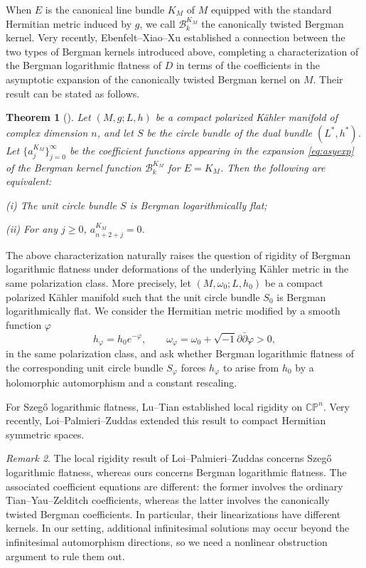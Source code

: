 \documentclass[11pt,reqno]{amsart}
\newtheorem{theorem}{Theorem}[section]
\theoremstyle{corollary}
\theoremstyle{conjecture}
\theoremstyle{assumption}
\theoremstyle{proposition}
\theoremstyle{remark}
\newtheorem{remark}[theorem]{Remark}
\numberwithin{equation}{section}
\newcommand{\ii}{\ensuremath{\sqrt{-1}}}
\newcommand{\pa}{\partial}
\newcommand{\pp}{\bar\partial}
\begin{document}
When $E$ is the canonical line bundle $K_M$ of $M$ equipped with the standard Hermitian metric induced by $g$, we call $\mathcal{B}_k^{K_M}$ the canonically twisted Bergman kernel. Very recently, Ebenfelt--Xiao--Xu \cite{EbenfeltXiaoXu2026} established a connection between the two types of Bergman kernels introduced above, completing a characterization of the Bergman logarithmic flatness of $D$ in terms of the coefficients in the asymptotic expansion of the canonically twisted Bergman kernel on $M$. Their result can be stated as follows.

\begin{theorem}[{\cite[Theorem~1.11]{EbenfeltXiaoXu2026}}]\label{thm:logflat}
Let $(M,g; L,h)$ be a compact polarized K\"ahler manifold of complex dimension $n$, and let $S$ be the circle bundle of the dual bundle $(L^*,h^*)$. Let $\{a^{K_M}_j\}_{j=0}^{\infty}$ be the coefficient functions appearing in the expansion \eqref{eq:asyexp} of the Bergman kernel function $\mathcal{B}^{K_M}_k$ for $E=K_M$. Then the following are equivalent:

(i) The unit circle bundle $S$ is Bergman logarithmically flat;

(ii) For any $j\geq 0$, $a^{K_M}_{n+2+j}=0$.
\end{theorem}

The above characterization naturally raises the question of rigidity of Bergman logarithmic flatness under deformations of the underlying K\"ahler metric in the same polarization class. More precisely, let $(M,\omega_0; L,h_0)$ be a compact polarized K\"ahler manifold such that the unit circle bundle $S_0$ is Bergman logarithmically flat. We consider the Hermitian metric modified by a smooth function $\varphi$
\[
h_\varphi=h_0e^{-\varphi}, \qquad \omega_\varphi=\omega_0+\ii\pa\pp\varphi>0,
\]
in the same polarization class, and ask whether Bergman logarithmic flatness of the corresponding unit circle bundle $S_{\varphi}$ forces $h_\varphi$ to arise from $h_0$ by a holomorphic automorphism and a constant rescaling.

For Szegő logarithmic flatness, Lu--Tian \cite[Theorem~1.2]{LuTian2004} established local rigidity on $\mathbb{CP}^n$. Very recently, Loi--Palmieri--Zuddas \cite[Theorem~1.1]{LoiPalmieriZuddas2026} extended this result to compact Hermitian symmetric spaces.

\begin{remark}
The local rigidity result of Loi--Palmieri--Zuddas \cite{LoiPalmieriZuddas2026} concerns Szegő logarithmic flatness, whereas ours concerns Bergman logarithmic flatness. The associated coefficient equations are different: the former involves the ordinary Tian--Yau--Zelditch coefficients, whereas the latter involves the canonically twisted Bergman coefficients. In particular, their linearizations have different kernels. In our setting, additional infinitesimal solutions may occur beyond the infinitesimal automorphism directions, so we need a nonlinear obstruction argument to rule them out.
\end{remark}
\end{document}
